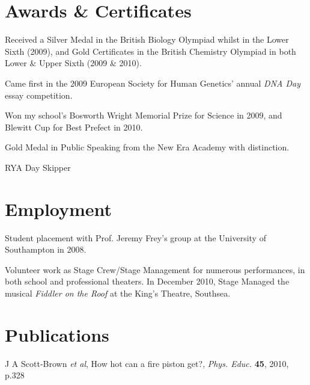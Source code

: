 \documentclass[letterpaper]{article}
\renewenvironment{itemize}{
  \begin{list}{}{
    \setlength{\leftmargin}{1.5em}
  }
}{
  \end{list}
}
\begin{document}
\section*{Awards \& Certificates}
\begin{itemize}
	\item Received a Silver Medal in the British Biology Olympiad whilst in the Lower Sixth (2009), and Gold Certificates in the British Chemistry Olympiad in both Lower \& Upper Sixth (2009 \& 2010). 
	\item Came first in the 2009 European Society for Human Genetics' annual \textit{DNA Day} essay competition. 
	\item Won my school's Bosworth Wright Memorial Prize for Science in 2009, and Blewitt Cup for Best Prefect in 2010.
 	\item Gold Medal in Public Speaking from the New Era Academy with distinction.
	\item RYA Day Skipper
\end{itemize}

\section*{Employment}
\begin{itemize}
	\item Student placement with Prof. Jeremy Frey's group at the University of Southampton in 2008.
	\item Volunteer work as Stage Crew/Stage Management for numerous performances, in both school and professional theaters. In December 2010, Stage Managed the musical \textit{Fiddler on the Roof} at the King's Theatre, Southsea.
\end{itemize}

\section*{Publications}
\begin{itemize}
\item J A Scott-Brown \textit{et al}, How hot can a fire piston get?, \textit{Phys. Educ.} {\bf 45}, 2010, p.328
\end{itemize}
\end{document}
